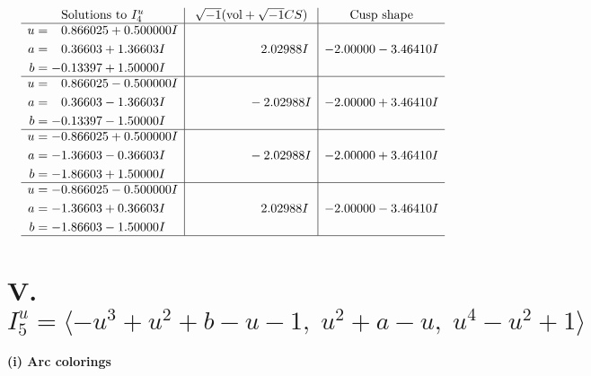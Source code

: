 \documentclass[1p]{elsarticle_modified}
\theoremstyle{definition}
\newcommand{\I}{\sqrt{-1}}
\begin{document}
$$\begin{array}{c|c|c}  
\text{Solutions to }I^u_{4}& \I (\text{vol} + \sqrt{-1}CS) & \text{Cusp shape}\\
 \hline 
\begin{aligned}
u &= \phantom{-}0.866025 + 0.500000 I \\
a &= \phantom{-}0.36603 + 1.36603 I \\
b &= -0.13397 + 1.50000 I\end{aligned}
 & \phantom{-0.000000 -}2.02988 I & -2.00000 - 3.46410 I \\ \hline\begin{aligned}
u &= \phantom{-}0.866025 - 0.500000 I \\
a &= \phantom{-}0.36603 - 1.36603 I \\
b &= -0.13397 - 1.50000 I\end{aligned}
 & \phantom{-0.000000 } -2.02988 I & -2.00000 + 3.46410 I \\ \hline\begin{aligned}
u &= -0.866025 + 0.500000 I \\
a &= -1.36603 - 0.36603 I \\
b &= -1.86603 + 1.50000 I\end{aligned}
 & \phantom{-0.000000 } -2.02988 I & -2.00000 + 3.46410 I \\ \hline\begin{aligned}
u &= -0.866025 - 0.500000 I \\
a &= -1.36603 + 0.36603 I \\
b &= -1.86603 - 1.50000 I\end{aligned}
 & \phantom{-0.000000 -}2.02988 I & -2.00000 - 3.46410 I\\
 \hline 
 \end{array}$$\newpage\newpage\renewcommand{\arraystretch}{1}
\centering \section*{V. $I^u_{5}= \langle - u^3+u^2+b- u-1,\;u^2+a- u,\;u^4- u^2+1 \rangle$}
\flushleft \textbf{(i) Arc colorings}\\
\end{document}

